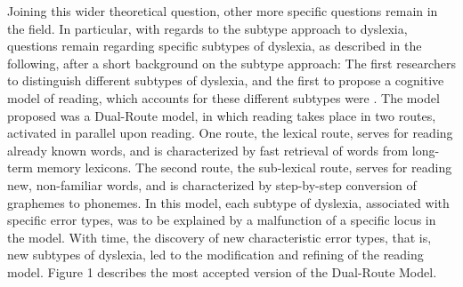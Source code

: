Joining this wider theoretical question, other more specific questions remain in the field. In particular, with regards to the subtype approach to dyslexia, questions remain regarding specific subtypes of dyslexia, as described in the following, after a short background on the subtype approach: The first researchers to distinguish different subtypes of dyslexia, and the first to propose a cognitive model of reading, which accounts for these different subtypes were \citet{mn73}. The model proposed was a Dual-Route model, in which reading takes place in two routes, activated in parallel upon reading. One route, the lexical route, serves for reading already known words, and is characterized by fast retrieval of words from long-term memory lexicons. The second route, the sub-lexical route, serves for reading new, non-familiar words, and is characterized by step-by-step conversion of graphemes to phonemes. In this model, each subtype of dyslexia, associated with specific error types, was to be explained by a malfunction of a specific locus in the model. With time, the discovery of new characteristic error types, that is, new subtypes of dyslexia, led to the modification and refining of the reading model. Figure 1 describes the most accepted version of the Dual-Route Model. 

